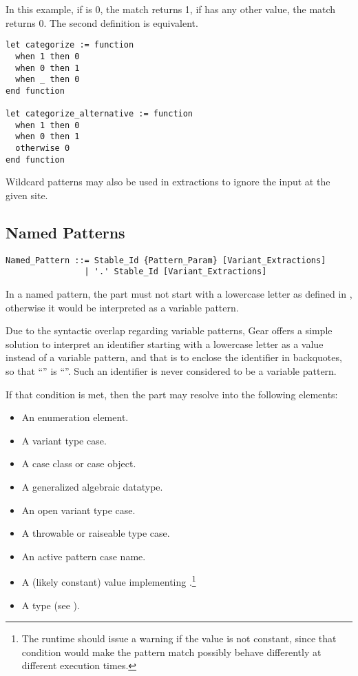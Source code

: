\example In this example, if  is 0, the match returns 1, if  has any other value, the match returns 0. The second definition is equivalent. 
\begin{lstlisting}
let categorize := function
  when 1 then 0
  when 0 then 1
  when _ then 0
end function

let categorize_alternative := function
  when 1 then 0
  when 0 then 1
  otherwise 0
end function
\end{lstlisting}

Wildcard patterns may also be used in extractions to ignore the input at the given site. 





\subsection{Named Patterns}
\label{sec:named-patterns}

\syntax\begin{lstlisting}
Named_Pattern ::= Stable_Id {Pattern_Param} [Variant_Extractions]
                | '.' Stable_Id [Variant_Extractions]
\end{lstlisting}

In a named pattern, the  part must not start with a lowercase letter as defined in , otherwise it would be interpreted as a variable pattern. 

Due to the syntactic overlap regarding variable patterns, Gear offers a simple solution to interpret an identifier starting with a lowercase letter as a value instead of a variable pattern, and that is to enclose the identifier in backquotes, so that ``'' is ``''. Such an identifier is never considered to be a variable pattern. 

If that condition is met, then the  part may resolve into the following elements:
\begin{itemize}
  \item An enumeration element. 
  \item A variant type case. 
  \item A case class or case object. 
  \item A generalized algebraic datatype. 
  \item An open variant type case. 
  \item A throwable or raiseable type case. 
  \item An active pattern case name. 
  \item A (likely constant) value implementing .\footnote{The runtime should issue a warning if the value is not constant, since that condition would make the pattern match possibly behave differently at different execution times.}
  \item A type (see ).
\end{itemize}

